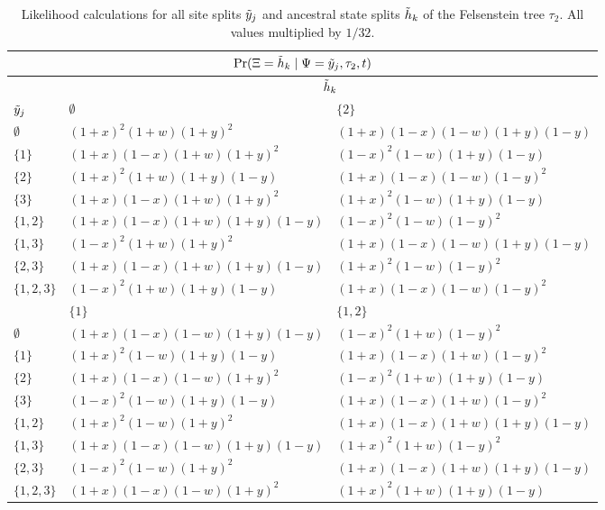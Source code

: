 \begin{table}
\centering
\begin{tabular}{|l|ll|}
\multicolumn{3}{c}{$\Pr(\Xi=\tilde{h}_k \mid \Psi=\tilde{y}_j, \tau_2, t)$}\\
\hline
& \multicolumn{2}{|c|}{$\tilde{h}_k$}\\
    \hline
    $\tilde{y}_j$    &$\emptyset$                                &$\{2\}$  \\
    \hline
     $\emptyset$   &$(1+x)^2   (1+w)(1+y)^2$           &$(1+x)(1-x)(1-w)(1+y)(1-y)$\\
     $\{1\}$       &$(1+x)(1-x)(1+w)(1+y)^2$           &$(1-x)^2   (1-w)(1+y)(1-y)$\\
     $\{2\}$       &$(1+x)^2   (1+w)(1+y)(1-y)$        &$(1+x)(1-x)(1-w)(1-y)^2$\\
     $\{3\}$       &$(1+x)(1-x)(1+w)(1+y)^2$           &$(1+x)^2   (1-w)(1+y)(1-y)$\\
     $\{1,2\}$     &$(1+x)(1-x)(1+w)(1+y)(1-y)$        &$(1-x)^2   (1-w)(1-y)^2$\\
     $\{1,3\}$     &$(1-x)^2   (1+w)(1+y)^2$           &$(1+x)(1-x)(1-w)(1+y)(1-y)$\\
     $\{2,3\}$     &$(1+x)(1-x)(1+w)(1+y)(1-y)$        &$(1+x)^2   (1-w)(1-y)^2$\\
     $\{1,2,3\}$   &$(1-x)^2   (1+w)(1+y)(1-y)$        &$(1+x)(1-x)(1-w)(1-y)^2$\\
    \hline
    \hline
    &$\{1\}$                             &$\{1,2\}$  \\
    \hline
     $\emptyset$   &$(1+x)(1-x)(1-w)(1+y)(1-y)$        &$(1-x)^2   (1+w)(1-y)^2$\\
     $\{1\}$       &$(1+x)^2   (1-w)(1+y)(1-y)$        &$(1+x)(1-x)(1+w)(1-y)^2$\\
     $\{2\}$       &$(1+x)(1-x)(1-w)(1+y)^2$           &$(1-x)^2   (1+w)(1+y)(1-y)$\\
     $\{3\}$       &$(1-x)^2   (1-w)(1+y)(1-y)$        &$(1+x)(1-x)(1+w)(1-y)^2$\\
     $\{1,2\}$     &$(1+x)^2   (1-w)(1+y)^2$           &$(1+x)(1-x)(1+w)(1+y)(1-y)$\\
     $\{1,3\}$     &$(1+x)(1-x)(1-w)(1+y)(1-y)$        &$(1+x)^2   (1+w)(1-y)^2$\\
     $\{2,3\}$     &$(1-x)^2   (1-w)(1+y)^2$           &$(1+x)(1-x)(1+w)(1+y)(1-y)$\\
     $\{1,2,3\}$   &$(1+x)(1-x)(1-w)(1+y)^2$           &$(1+x)^2   (1+w)(1+y)(1-y)$\\
\hline
\end{tabular}
\caption{Likelihood calculations for all site splits $\tilde{y}_j$ and ancestral state splits $\tilde{h}_k$ of the Felsenstein tree $\tau_2$.
All values multiplied by $1/32$.}
\label{tab:fels_likelihoods}
\end{table}

